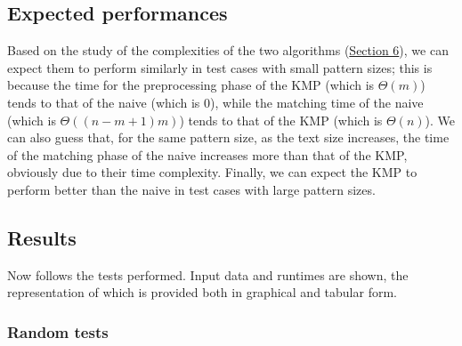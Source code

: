 \documentclass[11pt]{article}
\begin{document}
        \subsection{Expected performances} \label{subsec:expected_performances}

            Based on the study of the complexities of the two algorithms (\hyperref[sec:naive_kmp_differences]{Section 6}), we can expect them to perform similarly in test cases with small pattern sizes;
            this is because the time for the preprocessing phase of the KMP (which is $\Theta(m)$) tends to that of the naive (which is $0$),
            while the matching time of the naive (which is $\Theta((n-m+1)m)$) tends to that of the KMP (which is $\Theta(n)$).
            We can also guess that, for the same pattern size, as the text size increases,
            the time of the matching phase of the naive increases more than that of the KMP, obviously due to their time complexity.
            Finally, we can expect the KMP to perform better than the naive in test cases with large pattern sizes.

        \subsection{Results} \label{subsec:results}

            Now follows the tests performed.
            Input data and runtimes are shown, the representation of which is provided both in graphical and tabular form.

            \subsubsection{Random tests} \label{subsubsec:tests_1}
\end{document}
